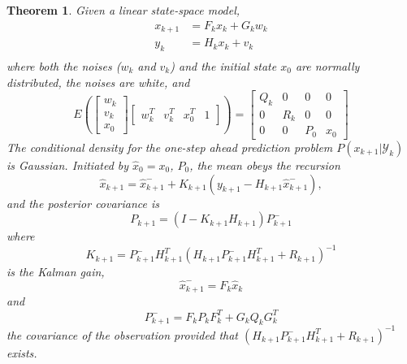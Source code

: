 \documentclass{article}
\newtheorem{thm}{Theorem}[section]
\theoremstyle{definition}
\theoremstyle{remark}
\newcommand{\filtrationObs}[1]{\ensuremath{\mathscr{Y}_{#1}}}
\begin{document}
\begin{thm}\label{thm:kalman}
Given a linear state-space model,
\begin{align*}
x_{k+1}&=F_kx_k+G_kw_k\\%
y_k&=H_kx_k+v_k\\%
\end{align*}
where both the noises ($w_k$ and $v_k$) and the initial state $x_0$ are normally distributed, the noises are white, and
\begin{equation}
E\left( \begin{bmatrix}w_k\\ v_k\\x_0 \end{bmatrix} 
\begin{bmatrix}w_k^T & v_k^T & x_0^T & 1 \end{bmatrix} \right)
=\begin{bmatrix}
Q_k & 0 & 0 & 0\\ 
0 & R_k & 0 & 0\\
0 & 0 & P_0 & x_0
\end{bmatrix}
\end{equation}
The conditional density for the one-step ahead prediction problem $P(x_{k+1}|\filtrationObs{k})$ is Gaussian. Initiated by $\hat{x}_0=x_0$, $P_0$, the mean obeys the recursion
\begin{equation}
\hat{x}_{k+1}=\hat{x}_{k+1}^-+K_{k+1}(y_{k+1}-H_{k+1}\hat{x}_{k+1}^-),
\end{equation}
and the posterior covariance is
\begin{equation}
P_{k+1}=(I-K_{k+1}H_{k+1})P^-_{k+1}
\end{equation}
where 
\begin{equation}\label{eq:kalGain}
K_{k+1}=P^-_{k+1}H_{k+1}^T(H_{k+1}P^-_{k+1}H_{k+1}^T+R_{k+1})^{-1}
\end{equation}
is the Kalman gain,
\begin{equation}
\hat{x}_{k+1}^-=F_k\hat{x}_k 
\end{equation}
and
\begin{equation}
P^-_{k+1}=F_kP_kF_k^T+G_kQ_kG_k^T
\end{equation}
the covariance of the observation provided that $(H_{k+1}P^-_{k+1}H_{k+1}^T+R_{k+1})^{-1}$ exists.
\end{thm}
\end{document}
